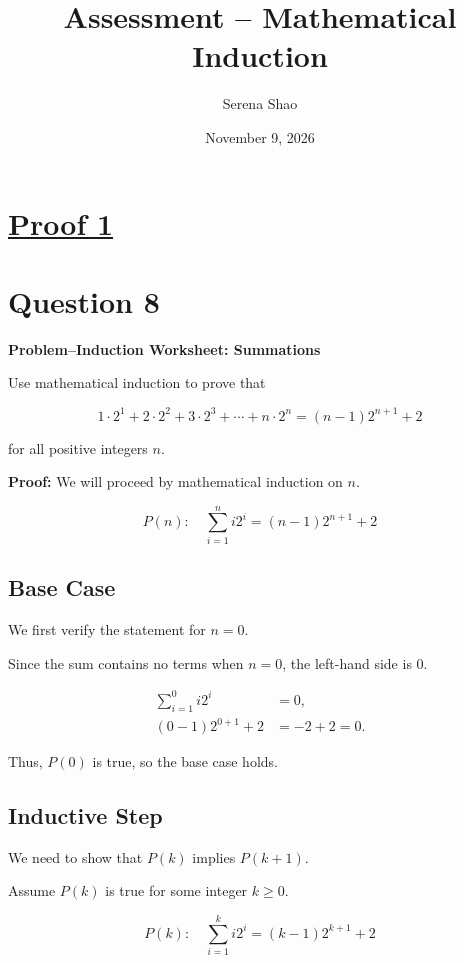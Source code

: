 \documentclass[12pt]{article}
\title{Assessment -- Mathematical Induction}
\author{Serena Shao}
\date{November 9, 2026}
\begin{document}
\maketitle

\section*{\Huge\underline{Proof 1}}
\vspace{-0.5cm}
\section*{Question 8}
\vspace{-0.7cm}
\textbf{Problem--Induction Worksheet: Summations}

\vspace{0.3cm}

Use mathematical induction to prove that

\[
1\cdot 2^1+2\cdot 2^2+3\cdot 2^3
+\cdots+n\cdot 2^n
=(n-1)2^{n+1}+2
\]

for all positive integers $n$.

\textbf{Proof:}
We will proceed by mathematical induction on $n$.

\[
P(n):\quad
\sum_{i=1}^{n}i2^i=(n-1)2^{n+1}+2
\]

\subsection*{Base Case}

We first verify the statement for $n=0$.

Since the sum contains no terms when $n=0$,
the left-hand side is $0$.

\[
\begin{aligned}
\sum_{i=1}^{0}i2^i &= 0,\\
(0-1)2^{0+1}+2 &= -2+2=0.
\end{aligned}
\]

Thus, $P(0)$ is true, so the base case holds.

\subsection*{Inductive Step}

We need to show that $P(k)$ implies $P(k+1)$.

Assume $P(k)$ is true for some integer $k\geq 0$.

\[
P(k):\quad
\sum_{i=1}^{k}i2^i=(k-1)2^{k+1}+2
\]
\end{document}
